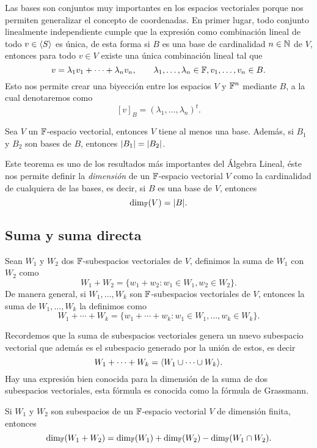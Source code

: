 Las bases son conjuntos muy importantes en los espacios vectoriales porque nos permiten generalizar el concepto de coordenadas. En primer lugar, todo conjunto linealmente independiente cumple que la expresión como combinación lineal de todo $v \in \langle S\rangle$ es única, de esta forma si $B$ es una base de cardinalidad $n \in \mathbb{N}$ de $V$, entonces para todo $v \in V$ existe una única combinación lineal tal que 
\[ v = \lambda_1 v_1 + \cdots + \lambda_n v_n, \qquad \lambda_1,\ldots,\lambda_n \in \mathbb{F}, v_1,\ldots,v_n \in B. \]
Esto nos permite crear una biyección entre los espacios $V$ y $\mathbb{F}^n$ mediante $B$, a la cual denotaremos como
\[ [v]_B = (\lambda_1, \ldots, \lambda_n)^t.\]

\begin{teor}
  Sea $V$ un $\mathbb{F}$-espacio vectorial, entonces $V$ tiene al menos una base. Además, si $B_1$ y $B_2$ son bases de $B$, entonces $\mathopen|B_1\mathclose| = \mathopen|B_2\mathclose|$.
\end{teor}

Este teorema es uno de los resultados más importantes del Álgebra Lineal, éste nos permite definir la \emph{dimensión} de un $\mathbb{F}$-espacio vectorial $V$ como la cardinalidad de cualquiera de las bases, es decir, si $B$ es una base de $V$, entonces
\[ \dim_{\mathbb{F}} (V) = \mathopen|B\mathclose|. \]


\subsection{Suma y suma directa}

\begin{defi}
  Sean $W_1$ y $W_2$ dos $\mathbb{F}$-subespacios vectoriales de $V$, definimos la suma de $W_1$ con $W_2$ como
  \[ W_1 + W_2 = \{ w_1 + w_2 : w_1 \in W_1, w_2 \in W_2 \}.\]
  De manera general, si $W_1, \ldots, W_k$ son $\mathbb{F}$-subespacios vectoriales de $V$, entonces la suma de $W_1, \ldots, W_k$  la definimos como
  \[ W_1 + \cdots + W_k = \{ w_1 + \cdots + w_k : w_1 \in W_1, \ldots ,w_k \in W_k \}.\]
\end{defi}

Recordemos que la suma de subespacios vectoriales genera un nuevo subespacio vectorial que además es el subespacio generado por la unión de estos, es decir
  \[ W_1 + \cdots + W_k = \langle W_1 \cup \cdots \cup W_k \rangle. \]
Hay una expresión bien conocida para la dimensión de la suma de dos subespacios vectoriales, esta fórmula es conocida como la fórmula de Grassmann.

\begin{teor}
  Si $W_1$ y $W_2$ son subespacios de un $\mathbb{F}$-espacio vectorial $V$ de dimensión finita, entonces
    \[ \dim_{\mathbb{F}} (W_1 + W_2) = \dim_{\mathbb{F}} (W_1) + \dim_{\mathbb{F}} (W_2) - \dim_{\mathbb{F}} (W_1 \cap W_2).\]
\end{teor}


